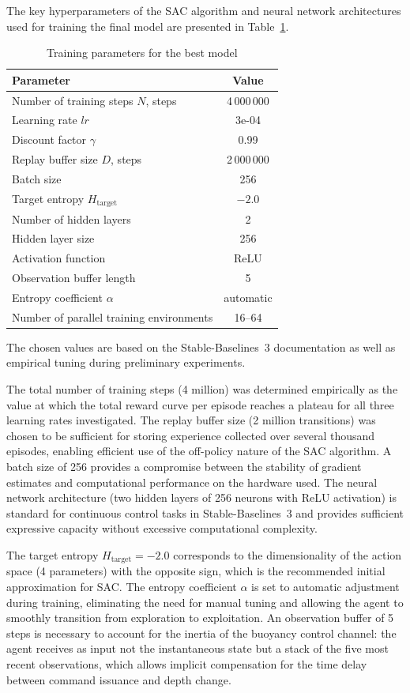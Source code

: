 \documentclass[12pt]{revtex4}
\begin{document}
The key hyperparameters of the SAC algorithm and neural network architectures used for training the final model are presented in Table~\ref{tab:training_params}. 

\begin{table}
\centering
{}
\caption{Training parameters for the best model}
\label{tab:training_params}
\begin{tabular}{lc}
\hline
Parameter & Value \\
\hline
Number of training steps $N$, steps & 4\,000\,000 \\
Learning rate $lr$ & 3e-04 \\
Discount factor $\gamma$ & 0.99 \\
Replay buffer size $D$, steps & 2\,000\,000 \\
Batch size & 256 \\
Target entropy $H_{\text{target}}$ & $-2.0$ \\
Number of hidden layers & 2 \\
Hidden layer size & 256 \\
Activation function & ReLU \\
Observation buffer length & 5 \\
Entropy coefficient $\alpha$ & automatic \\
Number of parallel training environments & 16--64 \\
\hline
\end{tabular}
\end{table}

The chosen values are based on the Stable-Baselines~3 documentation as well as empirical tuning during preliminary experiments.

The total number of training steps (4 million) was determined empirically as the value at which the total reward curve per episode reaches a plateau for all three learning rates investigated. The replay buffer size (2 million transitions) was chosen to be sufficient for storing experience collected over several thousand episodes, enabling efficient use of the off-policy nature of the SAC algorithm. A batch size of 256 provides a compromise between the stability of gradient estimates and computational performance on the hardware used. The neural network architecture (two hidden layers of 256 neurons with ReLU activation) is standard for continuous control tasks in Stable-Baselines~3 and provides sufficient expressive capacity without excessive computational complexity.

The target entropy $H_{\text{target}} = -2.0$ corresponds to the dimensionality of the action space (4 parameters) with the opposite sign, which is the recommended initial approximation for SAC. The entropy coefficient $\alpha$ is set to automatic adjustment during training, eliminating the need for manual tuning and allowing the agent to smoothly transition from exploration to exploitation. An observation buffer of 5 steps is necessary to account for the inertia of the buoyancy control channel: the agent receives as input not the instantaneous state but a stack of the five most recent observations, which allows implicit compensation for the time delay between command issuance and depth change.
\end{document}
